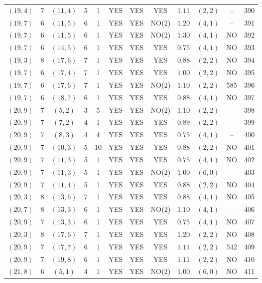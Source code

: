 \begin{longtable}{|c|c|c|c|c|c|c|c|c|c|c|c|}
$(19,4)$ & 7 & $(11,4)$ & 5 & 1 & YES & YES & YES & $1.11$ & $(2,2)$ & -- & 390\\
$(19,7)$ & 6 & $(11,5)$ & 6 & 1 & YES & YES & NO(2) & $1.20$ & $(4,1)$ & -- & 391\\
$(19,7)$ & 6 & $(11,5)$ & 6 & 1 & YES & YES & NO(2) & $1.30$ & $(4,1)$ & NO & 392\\
$(19,7)$ & 6 & $(14,5)$ & 6 & 1 & YES & YES & YES & $0.75$ & $(4,1)$ & NO & 393\\
$(19,3)$ & 8 & $(17,6)$ & 7 & 1 & YES & YES & YES & $0.88$ & $(2,2)$ & NO & 394\\
$(19,7)$ & 6 & $(17,4)$ & 7 & 1 & YES & YES & YES & $1.00$ & $(2,2)$ & NO & 395\\
$(19,7)$ & 6 & $(17,6)$ & 7 & 1 & YES & YES & NO(2) & $1.10$ & $(2,2)$ & 585 & 396\\
$(19,7)$ & 6 & $(18,7)$ & 6 & 1 & YES & YES & YES & $0.88$ & $(4,1)$ & NO & 397\\
$(20,9)$ & 7 & $(5,2)$ & 3 & 5 & YES & YES & NO(2) & $1.10$ & $(2,2)$ & -- & 398\\
$(20,9)$ & 7 & $(7,2)$ & 4 & 1 & YES & YES & YES & $0.89$ & $(2,2)$ & -- & 399\\
$(20,9)$ & 7 & $(8,3)$ & 4 & 4 & YES & YES & YES & $0.75$ & $(4,1)$ & -- & 400\\
$(20,9)$ & 7 & $(10,3)$ & 5 & 10 & YES & YES & YES & $0.88$ & $(2,2)$ & NO & 401\\
$(20,9)$ & 7 & $(11,3)$ & 5 & 1 & YES & YES & YES & $0.75$ & $(4,1)$ & NO & 402\\
$(20,9)$ & 7 & $(11,3)$ & 5 & 1 & YES & YES & NO(2) & $1.00$ & $(6,0)$ & -- & 403\\
$(20,9)$ & 7 & $(11,4)$ & 5 & 1 & YES & YES & YES & $0.88$ & $(2,2)$ & NO & 404\\
$(20,3)$ & 8 & $(13,6)$ & 7 & 1 & YES & YES & YES & $0.88$ & $(4,1)$ & NO & 405\\
$(20,7)$ & 8 & $(13,3)$ & 6 & 1 & YES & YES & NO(2) & $1.10$ & $(4,1)$ & -- & 406\\
$(20,9)$ & 7 & $(13,3)$ & 6 & 1 & YES & YES & YES & $0.75$ & $(4,1)$ & NO & 407\\
$(20,3)$ & 8 & $(17,6)$ & 7 & 1 & YES & YES & YES & $1.20$ & $(2,2)$ & NO & 408\\
$(20,9)$ & 7 & $(17,7)$ & 6 & 1 & YES & YES & YES & $1.11$ & $(2,2)$ & 542 & 409\\
$(20,9)$ & 7 & $(19,8)$ & 6 & 1 & YES & YES & YES & $1.11$ & $(2,2)$ & NO & 410\\
$(21,8)$ & 6 & $(5,1)$ & 4 & 1 & YES & YES & NO(2) & $1.00$ & $(6,0)$ & NO & 411\\

\end{longtable}
